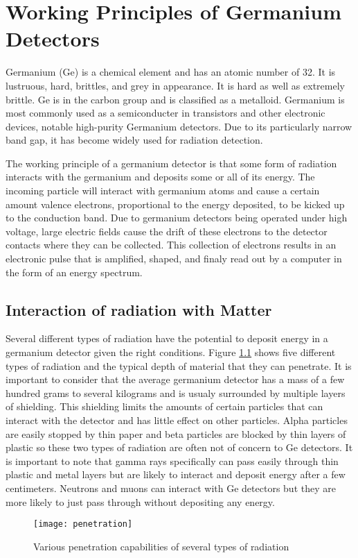 \chapter{Working Principles of Germanium Detectors}
Germanium (Ge) is a chemical element and has an atomic number of 32.
It is lustruous, hard, brittles, and grey in appearance.
It is hard as well as extremely brittle.
Ge is in the carbon group and is classified as a metalloid.
Germanium is most commonly used as a semiconducter in transistors and other electronic devices, notable high-purity Germanium detectors.
Due to its particularly narrow band gap, it has become widely used for radiation detection. 

The working principle of a germanium detector is that some form of radiation interacts with the germanium and deposits some or all of its energy.
The incoming particle will interact with germanium atoms and cause a certain amount valence electrons, proportional to the energy deposited, to be kicked up to the conduction band.
Due to germanium detectors being operated under high voltage, large electric fields cause the drift of these electrons to the detector contacts where they can be collected.
This collection of electrons results in an electronic pulse that is amplified, shaped, and finaly read out by a computer in the form of an energy spectrum.

\section{Interaction of radiation with Matter}
Several different types of radiation have the potential to deposit energy in a germanium detector given the right conditions.
Figure \ref{fig:penetration} shows five different types of radiation and the typical depth of material that they can penetrate.
It is important to consider that the average germanium detector has a mass of a few hundred grams to several kilograms and is usualy surrounded by multiple layers of shielding.
This shielding limits the amounts of certain particles that can interact with the detector and has little effect on other particles.
Alpha particles are easily stopped by thin paper and beta particles are blocked by thin layers of plastic so these two types of radiation are often not of concern to Ge detectors.
It is important to note that gamma rays specifically can pass easily through thin plastic and metal layers but are likely to interact and deposit energy after a few centimeters.
Neutrons and muons can interact with Ge detectors but they are more likely to just pass through without depositing any energy.
\begin{figure}[htpb]
\centering
\texttt{[image: penetration]}
\caption{Various penetration capabilities of several types of radiation}
\label{fig:penetration}
\end{figure}

